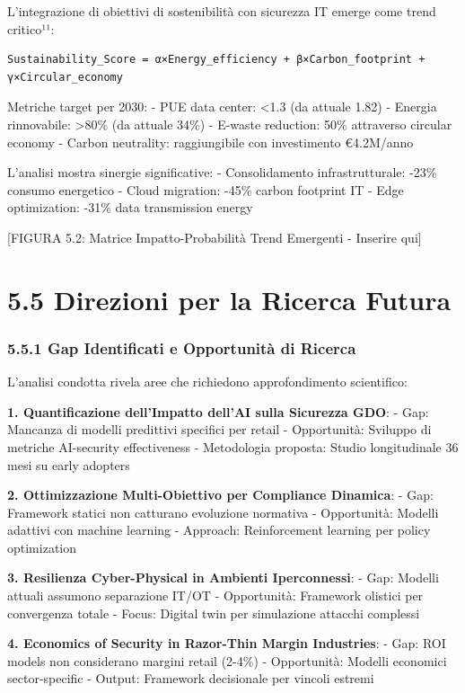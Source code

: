 \documentclass{report}
\begin{document}
L'integrazione di obiettivi di sostenibilità con sicurezza IT emerge
come trend critico¹¹:

\begin{verbatim}
Sustainability_Score = α×Energy_efficiency + β×Carbon_footprint + γ×Circular_economy
\end{verbatim}

Metriche target per 2030: - PUE data center: \textless1.3 (da attuale
1.82) - Energia rinnovabile: \textgreater80\% (da attuale 34\%) -
E-waste reduction: 50\% attraverso circular economy - Carbon neutrality:
raggiungibile con investimento €4.2M/anno

L'analisi mostra sinergie significative: - Consolidamento
infrastrutturale: -23\% consumo energetico - Cloud migration: -45\%
carbon footprint IT - Edge optimization: -31\% data transmission energy

{[}FIGURA 5.2: Matrice Impatto-Probabilità Trend Emergenti - Inserire
qui{]}

\section{5.5 Direzioni per la Ricerca
Futura}\label{direzioni-per-la-ricerca-futura}

\subsubsection{5.5.1 Gap Identificati e Opportunità di
Ricerca}\label{gap-identificati-e-opportunituxe0-di-ricerca}

L'analisi condotta rivela aree che richiedono approfondimento
scientifico:

\textbf{1. Quantificazione dell'Impatto dell'AI sulla Sicurezza GDO}: -
Gap: Mancanza di modelli predittivi specifici per retail - Opportunità:
Sviluppo di metriche AI-security effectiveness - Metodologia proposta:
Studio longitudinale 36 mesi su early adopters

\textbf{2. Ottimizzazione Multi-Obiettivo per Compliance Dinamica}: -
Gap: Framework statici non catturano evoluzione normativa - Opportunità:
Modelli adattivi con machine learning - Approach: Reinforcement learning
per policy optimization

\textbf{3. Resilienza Cyber-Physical in Ambienti Iperconnessi}: - Gap:
Modelli attuali assumono separazione IT/OT - Opportunità: Framework
olistici per convergenza totale - Focus: Digital twin per simulazione
attacchi complessi

\textbf{4. Economics of Security in Razor-Thin Margin Industries}: -
Gap: ROI models non considerano margini retail (2-4\%) - Opportunità:
Modelli economici sector-specific - Output: Framework decisionale per
vincoli estremi
\end{document}
